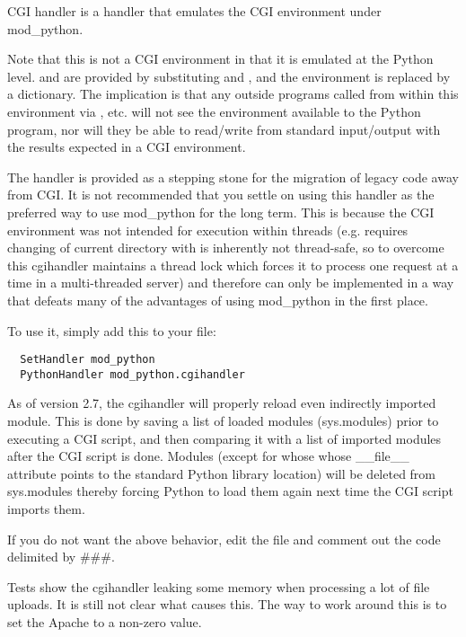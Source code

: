
CGI handler is a handler that emulates the CGI environment under mod_python. 

Note that this is not a  CGI environment in that it is
emulated at the Python level.  and  are
provided by substituting  and , and
the environment is replaced by a dictionary. The implication is that
any outside programs called from within this environment via
, etc. will not see the environment available to the
Python program, nor will they be able to read/write from standard
input/output with the results expected in a  CGI environment.

The handler is provided as a stepping stone for the migration of
legacy code away from CGI. It is not recommended that you settle on
using this handler as the preferred way to use mod_python for the long
term. This is because the CGI environment was not intended for
execution within threads (e.g. requires changing of current directory
with is inherently not thread-safe, so to overcome this cgihandler
maintains a thread lock which forces it to process one request at a
time in a multi-threaded server) and therefore can only be implemented
in a way that defeats many of the advantages of using mod_python in
the first place.

To use it, simply add this to your  file: 

\begin{verbatim}
  SetHandler mod_python
  PythonHandler mod_python.cgihandler
\end{verbatim}

As of version 2.7, the cgihandler will properly reload even indirectly
imported module. This is done by saving a list of loaded modules
(sys.modules) prior to executing a CGI script, and then comparing it
with a list of imported modules after the CGI script is done.  Modules
(except for whose whose __file__ attribute points to the standard
Python library location) will be deleted from sys.modules thereby
forcing Python to load them again next time the CGI script imports
them.

If you do not want the above behavior, edit the 
file and comment out the code delimited by \#\#\#.

Tests show the cgihandler leaking some memory when processing a lot of
file uploads. It is still not clear what causes this. The way to work
around this is to set the Apache  to a non-zero
value.


